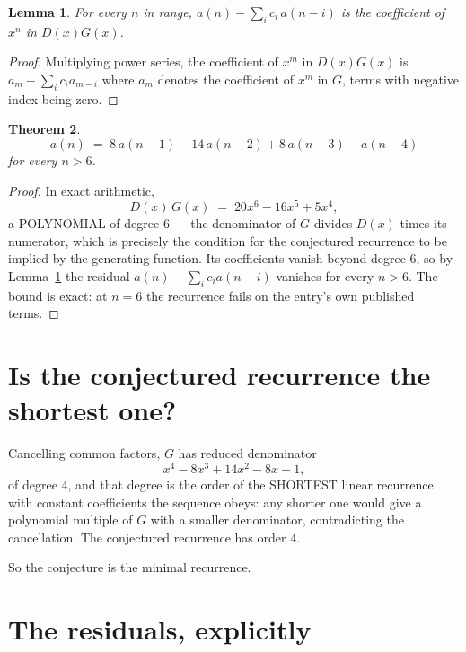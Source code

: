 \documentclass[11pt,a4paper]{article}
\theoremstyle{plain}
\newtheorem{theorem}{Theorem}
\newtheorem{lemma}[theorem]{Lemma}
\theoremstyle{definition}
\begin{document}
\begin{lemma}\label{lem:key}
For every $n$ in range, $a(n)-\sum_i c_i\,a(n-i)$ is the coefficient of $x^{n}$ in
$D(x)G(x)$.
\end{lemma}

\begin{proof}
Multiplying power series, the coefficient of $x^{m}$ in $D(x)G(x)$ is
$a_m-\sum_i c_i a_{m-i}$ where $a_m$ denotes the coefficient of $x^{m}$ in $G$, terms with
negative index being zero.
\end{proof}

\begin{theorem}
\[
a(n)\;=\;8\,a(n-1) - 14\,a(n-2) + 8\,a(n-3) - a(n-4)
\]
for every $n>6$.
\end{theorem}

\begin{proof}
In exact arithmetic,
\[
D(x)\,G(x)\;=\;20 x^{6} - 16 x^{5} + 5 x^{4},
\]
a POLYNOMIAL of degree $6$ --- the denominator of $G$ divides $D(x)$ times its numerator,
which is precisely the condition for the conjectured recurrence to be implied by the
generating function. Its coefficients vanish beyond degree $6$, so by
Lemma~\ref{lem:key} the residual $a(n)-\sum_ic_ia(n-i)$ vanishes for every
$n>6$. The bound is exact: at $n=6$ the recurrence fails on the entry's own published terms.
\end{proof}

\section{Is the conjectured recurrence the shortest one?}

Cancelling common factors, $G$ has reduced denominator
\[
x^{4} - 8 x^{3} + 14 x^{2} - 8 x + 1,
\]
of degree $4$, and that degree is the order of the SHORTEST linear recurrence with
constant coefficients the sequence obeys: any shorter one would give a polynomial multiple of
$G$ with a smaller denominator, contradicting the cancellation. The conjectured recurrence has
order $4$.

So the conjecture is the minimal recurrence.

\section{The residuals, explicitly}
\end{document}
